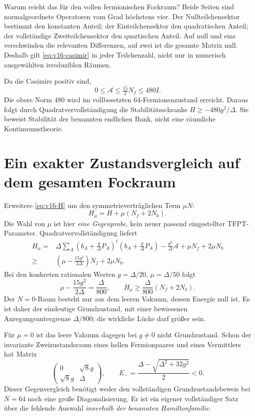 Warum reicht das für den vollen fermionischen Fockraum? Beide Seiten sind normalgeordnete Operatoren vom Grad höchstens vier. Der Nullteilchensektor bestimmt den konstanten Anteil; der Einteilchensektor den quadratischen Anteil; der vollständige Zweiteilchensektor den quartischen Anteil. Auf null und eins verschwinden die relevanten Differenzen, auf zwei ist die gesamte Matrix null. Deshalb gilt \eqref{eq:v16-casimir} in jeder Teilchenzahl, nicht nur in numerisch ausgewählten irreduziblen Räumen.

Da die Casimirs positiv sind,
\begin{equation}
0\le\mathcal A\le\tfrac{15}{2}N_f\le480I.
\end{equation}
Die obere Norm 480 wird im vollbesetzten 64-Fermionenzustand erreicht. Daraus folgt durch Quadratvervollständigung die Stabilitätsschranke $H\ge-480g^2/\Delta$. Sie beweist Stabilität der benannten endlichen Bank, nicht eine räumliche Kontinuumstheorie.

\section{Ein exakter Zustandsvergleich auf dem gesamten Fockraum}
Erweitere \eqref{eq:v16-H} um den symmetrieverträglichen Term $\mu N$:
\begin{equation}
H_\mu=H+\mu(N_f+2N_b).
\end{equation}
Die Wahl von $\mu$ ist hier \emph{eine Gegenprobe}, kein neuer passend eingestellter TFPT-Parameter. Quadratvervollständigung liefert
\begin{align}
H_\mu={}&\Delta\sum_A\left(b_A+\frac g\Delta P_A\right)^\dagger
\left(b_A+\frac g\Delta P_A\right)
-\frac{g^2}{\Delta}\mathcal A+\mu N_f+2\mu N_b\\
\ge{}&\left(\mu-\frac{15g^2}{2\Delta}\right)N_f+2\mu N_b.
\end{align}
Bei den konkreten rationalen Werten $g=\Delta/20$, $\mu=\Delta/50$ folgt
\begin{equation}
\mu-\frac{15g^2}{2\Delta}=\frac\Delta{800},\qquad
\boxed{H_\mu\ge\frac\Delta{800}(N_f+2N_b).}
\label{eq:v16-vacuum}
\end{equation}
Der $N=0$-Raum besteht nur aus dem leeren Vakuum, dessen Energie null ist. Es ist daher der eindeutige Grundzustand, mit einer bewiesenen Anregungsuntergrenze $\Delta/800$; die wirkliche Lücke darf größer sein.

Für $\mu=0$ ist das leere Vakuum dagegen bei $g\ne0$ nicht Grundzustand. Schon der invariante Zweizustandsraum eines hellen Fermionpaares und eines Vermittlers hat Matrix
\begin{equation}
\begin{pmatrix}0&\sqrt8g\\\sqrt8g&\Delta\end{pmatrix},\qquad
E_- =\frac{\Delta-\sqrt{\Delta^2+32g^2}}2<0.
\end{equation}
Dieser Gegenvergleich benötigt weder den vollständigen Grundzustandsbeweis bei $N=64$ noch eine große Diagonalisierung. Er ist ein eigener vollständiger Satz über die fehlende Auswahl \emph{innerhalb der benannten Hamiltonfamilie}.

